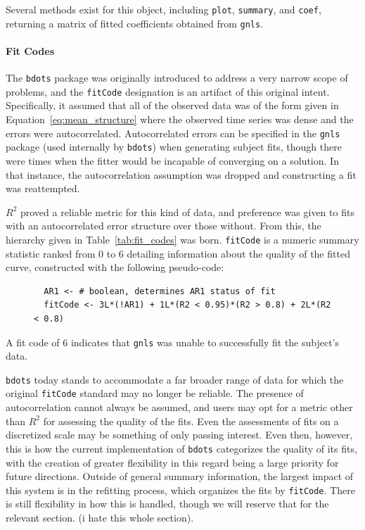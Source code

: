 \documentclass{article}
\newcommand{\xt}{\texttt}%
\begin{document}
Several methods exist for this object, including \texttt{plot}, \texttt{summary}, and \texttt{coef}, returning a matrix of fitted coefficients obtained from \texttt{gnls}. 


\paragraph{Fit Codes}\label{sec:fitcode}

The \xt{bdots} package was originally introduced to address a very narrow scope of problems, and the \xt{fitCode} designation is an artifact of this original intent. Specifically, it assumed that all of the observed data was of the form given in Equation~\ref{eq:mean_structure} where the observed time series was dense and the errors were autocorrelated. Autocorrelated errors can be specified in the \xt{gnls} package (used internally by \xt{bdots}) when generating subject fits, though there were times when the fitter would be incapable of converging on  a solution. In that instance, the autocorrelation assumption was dropped and constructing a fit was reattempted.

$R^2$ proved a reliable metric for this kind of data, and preference was given to fits with an autocorrelated error structure over those without. From this, the hierarchy given in Table~\ref{tab:fit_codes} was born. \xt{fitCode} is a numeric summary statistic ranked from 0 to 6 detailing information about the quality of the fitted curve, constructed with the following pseudo-code:

\begin{singlespace}
\begin{figure}[H]
\centering
\begin{BVerbatim}
  AR1 <- # boolean, determines AR1 status of fit
  fitCode <- 3L*(!AR1) + 1L*(R2 < 0.95)*(R2 > 0.8) + 2L*(R2 < 0.8)
\end{BVerbatim}
\end{figure}
\end{singlespace}

A fit code of 6 indicates that \xt{gnls} was unable to successfully fit the 
subject's data. 

\xt{bdots} today stands to accommodate a far broader range of data for which the original \xt{fitCode} standard may no longer be reliable. The presence of autocorrelation cannot always be assumed, and users may opt for a metric other than $R^2$ for assessing the quality of the fits. Even the assessments of fits on a discretized scale may be something of only passing interest. Even then, however, this is how the current implementation of \xt{bdots} categorizes the quality of its fits, with the creation of greater flexibility in this regard being a large priority for future directions. Outside of general summary information, the largest impact of this system is in the refitting process, which organizes the fits by \xt{fitCode}. There is still flexibility in how this is handled, though we will reserve that for the relevant section. (i hate this whole section).
\end{document}
